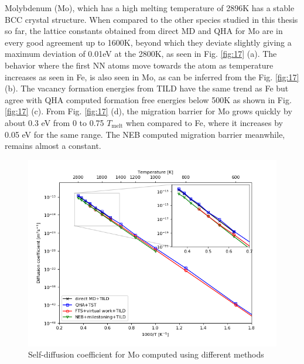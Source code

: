 \documentclass{article}
\begin{document}
Molybdenum (Mo), which has a high melting temperature of 2896K has a stable BCC crystal structure. When compared to the other species studied in this thesis so far, the lattice constants obtained from direct MD and QHA for Mo are in every good agreement up to 1600K, beyond which they deviate slightly giving a maximum deviation of 0.01eV at the 2800K, as seen in Fig. \ref{fig:17} (a). The behavior where the first NN atoms move towards the atom as temperature increases as seen in Fe, is also seen in Mo, as can be inferred from the Fig. \ref{fig:17} (b). The vacancy formation energies from TILD have the same trend as Fe but agree with QHA computed formation free energies below 500K as shown in Fig. \ref{fig:17} (c). From Fig. \ref{fig:17} (d), the migration barrier for Mo grows quickly by about 0.3 eV from 0 to 0.75 $T_{\mathrm{melt}}$ when compared to Fe, where it increases by 0.05 eV for the same range. The NEB computed migration barrier meanwhile, remains almost a constant.

\begin{figure}[htp]
\centering
\includegraphics[scale=0.65]{mo_self_diffusion}
\caption{Self-diffusion coefficient for Mo computed using different methods}
\label{fig:18}
\end{figure}
\end{document}
